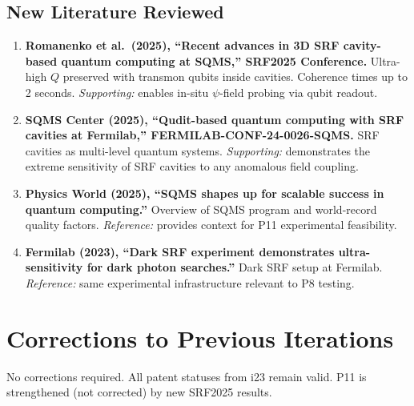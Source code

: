 \documentclass[11pt]{article}
\begin{document}
\subsection{New Literature Reviewed}

\begin{tcolorbox}[colback=green!5!white, colframe=green!50!black,
  title=\textbf{Agent 8: NEW LITERATURE REVIEWED}]

\begin{enumerate}

\item \textbf{Romanenko et al.\ (2025), ``Recent advances in 3D SRF
  cavity-based quantum computing at SQMS,'' SRF2025 Conference.}
  Ultra-high $Q$ preserved with transmon qubits inside cavities.
  Coherence times up to 2 seconds. \emph{Supporting:} enables
  in-situ $\psi$-field probing via qubit readout.

\item \textbf{SQMS Center (2025), ``Qudit-based quantum computing
  with SRF cavities at Fermilab,'' FERMILAB-CONF-24-0026-SQMS.}
  SRF cavities as multi-level quantum systems. \emph{Supporting:}
  demonstrates the extreme sensitivity of SRF cavities to any
  anomalous field coupling.

\item \textbf{Physics World (2025), ``SQMS shapes up for scalable
  success in quantum computing.''}
  Overview of SQMS program and world-record quality factors.
  \emph{Reference:} provides context for P11 experimental feasibility.

\item \textbf{Fermilab (2023), ``Dark SRF experiment demonstrates
  ultra-sensitivity for dark photon searches.''}
  Dark SRF setup at Fermilab. \emph{Reference:} same experimental
  infrastructure relevant to P8 testing.

\end{enumerate}
\end{tcolorbox}

\section{Corrections to Previous Iterations}

\begin{tcolorbox}[colback=yellow!5!white, colframe=yellow!70!black,
  title=\textbf{CORRECTIONS FROM i24}]

No corrections required. All patent statuses from i23 remain valid.
P11 is strengthened (not corrected) by new SRF2025 results.

\end{tcolorbox}
\end{document}
